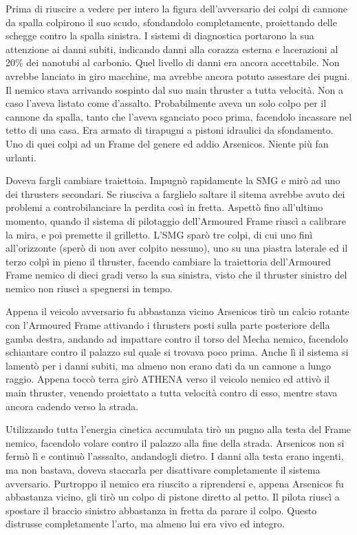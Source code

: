     Prima di riuscire a vedere per intero la figura dell'avversario dei colpi di cannone da spalla colpirono il suo
    scudo, sfondandolo completamente, proiettando delle schegge contro la spalla sinistra. I sistemi di diagnostica
    portarono la sua attenzione ai danni subiti, indicando danni alla corazza esterna e lacerazioni al 20\% dei nanotubi
    al carbonio. Quel livello di danni era ancora accettabile. Non avrebbe lanciato in giro macchine, ma avrebbe ancora
    potuto assestare dei pugni. Il nemico stava arrivando sospinto dal suo main thruster a tutta velocità. Non a caso
    l'aveva listato come d'assalto. Probabilmente aveva un solo colpo per il cannone da spalla, tanto che l'aveva
    sganciato poco prima, facendolo incassare nel tetto di una casa. Era armato di tirapugni a pistoni idraulici da
    sfondamento. Uno di quei colpi ad un Frame del genere ed addio Arsenicos. Niente più fan urlanti.

    Doveva fargli cambiare traiettoia. Impugnò rapidamente la SMG e mirò ad uno dei thrusters secondari. Se riusciva a
    farglielo saltare il sitema avrebbe avuto dei problemi a controbilanciare la perdita così in fretta. Aspettò fino
    all'ultimo momento, quando il sistema di pilotaggio dell'Armoured Frame riuscì a calibrare la mira, e poi premette
    il grilletto. L'SMG sparò tre colpi, di cui uno finì all'orizzonte (sperò di non aver colpito nessuno), uno su una
    piastra laterale ed il terzo colpì in pieno il thruster, facendo cambiare la traiettoria dell'Armoured Frame nemico
    di dieci gradi verso la sua sinistra, visto che il thruster sinistro del nemico non riuscì a spegnersi in tempo.

    Appena il veicolo avversario fu abbastanza vicino Arsenicos tirò un calcio rotante con l'Armoured Frame attivando i
    thrusters posti sulla parte posteriore della gamba destra, andando ad impattare contro il torso del Mecha nemico,
    facendolo schiantare contro il palazzo sul quale si trovava poco prima. Anche lì il sistema si lamentò per i danni
    subiti, ma almeno non erano dati da un cannone a lungo raggio. Appena toccò terra girò ATHENA verso il veicolo
    nemico ed attivò il main thruster, venendo proiettato a tutta velocità contro di esso, mentre stava ancora cadendo
    verso la strada.
    
    Utilizzando tutta l'energia cinetica accumulata tirò un pugno alla testa del Frame nemico, facendolo volare contro
    il palazzo alla fine della strada. Arsenicos non si fermò lì e continuò l'asssalto, andandogli dietro. I danni alla
    testa erano ingenti, ma non bastava, doveva staccarla per disattivare completamente il sistema avversario. Purtroppo
    il nemico era riuscito a riprendersi e, appena Arsenicos fu abbastanza vicino, gli tirò un colpo di pistone diretto
    al petto. Il pilota riuscì a spostare il braccio sinistro abbastanza in fretta da parare il colpo. Questo distrusse
    completamente l'arto, ma almeno lui era vivo ed integro.


